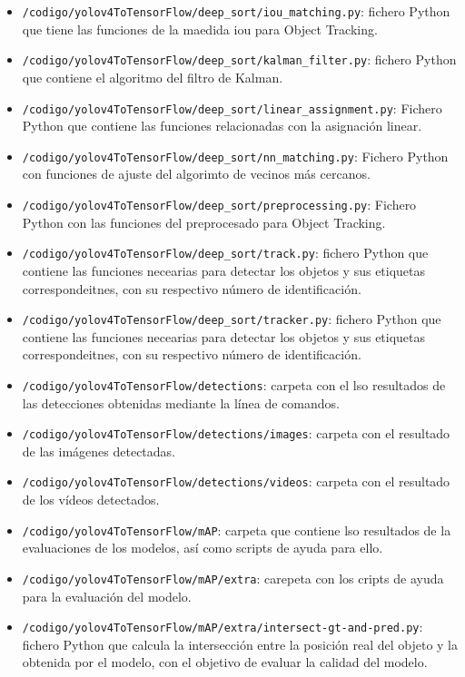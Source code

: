 \begin{itemize}
    \item \texttt{/codigo/yolov4ToTensorFlow/deep\_sort/iou\_matching.py}: fichero Python que tiene las funciones de la maedida iou para Object Tracking.
    \item \texttt{/codigo/yolov4ToTensorFlow/deep\_sort/kalman\_filter.py}: fichero Python que contiene el algoritmo del filtro de Kalman\cite{kalman_filter}.  
    \item \texttt{/codigo/yolov4ToTensorFlow/deep\_sort/linear\_assignment.py}: Fichero Python que contiene las funciones relacionadas con la asignación linear.
    \item \texttt{/codigo/yolov4ToTensorFlow/deep\_sort/nn\_matching.py}: Fichero Python con funciones de ajuste del algorimto de vecinos más cercanos\cite{knn}.
    \item \texttt{/codigo/yolov4ToTensorFlow/deep\_sort/preprocessing.py}: Fichero Python con las funciones del preprocesado para Object Tracking.
    \item \texttt{/codigo/yolov4ToTensorFlow/deep\_sort/track.py}: fichero Python que contiene las funciones necearias para detectar los objetos y sus etiquetas correspondeitnes, con su respectivo número de identificación.
    \item \texttt{/codigo/yolov4ToTensorFlow/deep\_sort/tracker.py}: fichero Python que contiene las funciones necearias para detectar los objetos y sus etiquetas correspondeitnes, con su respectivo número de identificación.
    \item \texttt{/codigo/yolov4ToTensorFlow/detections}: carpeta con el lso resultados de las detecciones obtenidas mediante la línea de comandos.
    \item \texttt{/codigo/yolov4ToTensorFlow/detections/images}: carpeta con el resultado de las imágenes detectadas.
    \item \texttt{/codigo/yolov4ToTensorFlow/detections/videos}: carpeta con el resultado de los vídeos detectados.
    \item \texttt{/codigo/yolov4ToTensorFlow/mAP}: carpeta que contiene lso resultados de la evaluaciones de los modelos, así como scripts de ayuda para ello.
    \item \texttt{/codigo/yolov4ToTensorFlow/mAP/extra}: carepeta con los cripts de ayuda para la evaluación del modelo.
    \item \texttt{/codigo/yolov4ToTensorFlow/mAP/extra/intersect-gt-and-pred.py}: fichero Python que calcula la intersección entre la posición real del objeto y la obtenida por el modelo, con el objetivo de evaluar la calidad del modelo.

\end{itemize}
